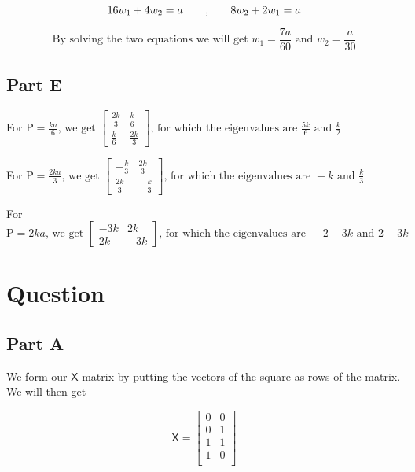\documentclass[12pt,a4paper]{article}
\newcommand{\mat}[1]{\boldsymbol { \mathsf{#1}} }
\begin{document}
$$16w_1 + 4w_2 = a \text{  \hspace{0.6cm},\hspace{0.6cm} } 8w_2 + 2w_1 = a $$

$$\text{By solving the two equations we will get } w_1 = \frac{7a}{60} \text{ and } w_2 = \frac{a}{30}$$

\subsection{Part E}

For $\text{P} = \frac{ka}{6}\text{, we get }
\begin{bmatrix}
\frac{2k}{3} & \frac{k}{6}\\
\frac{k}{6} & \frac{2k}{3}
\end{bmatrix}
\text{, for which the eigenvalues are } \frac{5k}{6} \text{ and } \frac{k}{2}
$

For $\text{P} = \frac{2ka}{3}\text{, we get }
\begin{bmatrix}
-\frac{k}{3} & \frac{2k}{3}\\
\frac{2k}{3} & -\frac{k}{3}
\end{bmatrix}
\text{, for which the eigenvalues are } -k \text{ and } \frac{k}{3}
$

For $\text{P} = 2ka\text{, we get }
\begin{bmatrix}
-3k & 2k\\
2k & -3k
\end{bmatrix}
\text{, for which the eigenvalues are } -2-3k \text{ and } 2-3k
$




\section{Question}
\subsection{Part A}

We form our $\mat{X}$ matrix by putting the vectors of the square as rows of the matrix. We will then get 

$$
\mat X = 
\begin{bmatrix}
0 & 0 \\
0 & 1 \\
1 & 1 \\
1 & 0 \\
\end{bmatrix}
$$
\end{document}
